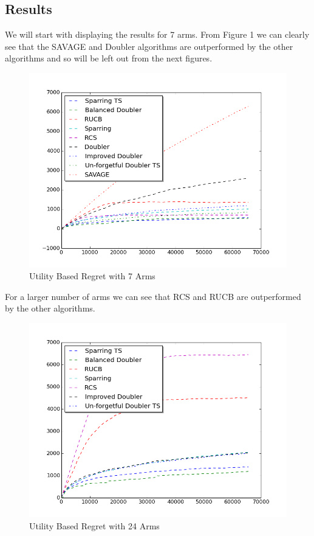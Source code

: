 \documentclass{llncs}
\begin{document}
\subsection{Results}
We will start with displaying the results for 7 arms.
From Figure 1 we can clearly see that the SAVAGE and Doubler algorithms are outperformed by the other algorithms and so will be left out from the next figures.
\begin{figure}[h!]
\centering
  \includegraphics[scale=0.5, natwidth=610,natheight=642]{figures/all_MQ2007_7arms.png}
  \caption{Utility Based Regret with 7 Arms}
\end{figure}

For a larger number of arms we can see that RCS and RUCB are outperformed by the other algorithms.

\begin{figure}[h!]
\centering
  \includegraphics[scale=0.5, natwidth=610,natheight=642]{figures/all_MQ2007_24arms.png}
  \caption{Utility Based Regret with 24 Arms}
\end{figure}
\end{document}
